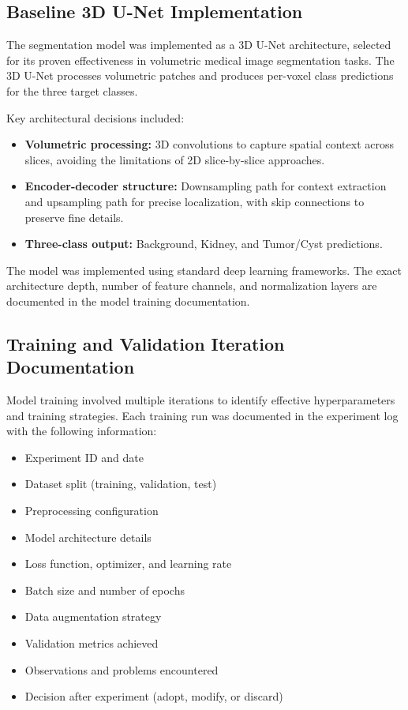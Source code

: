 \subsection{Baseline 3D U-Net Implementation}

The segmentation model was implemented as a 3D U-Net architecture, selected for its proven effectiveness in volumetric medical image segmentation tasks. The 3D U-Net processes volumetric patches and produces per-voxel class predictions for the three target classes.

Key architectural decisions included:
\begin{itemize}
    \item \textbf{Volumetric processing:} 3D convolutions to capture spatial context across slices, avoiding the limitations of 2D slice-by-slice approaches.
    \item \textbf{Encoder-decoder structure:} Downsampling path for context extraction and upsampling path for precise localization, with skip connections to preserve fine details.
    \item \textbf{Three-class output:} Background, Kidney, and Tumor/Cyst predictions.
\end{itemize}

The model was implemented using standard deep learning frameworks. The exact architecture depth, number of feature channels, and normalization layers are documented in the model training documentation.

\subsection{Training and Validation Iteration Documentation}

Model training involved multiple iterations to identify effective hyperparameters and training strategies. Each training run was documented in the experiment log with the following information:

\begin{itemize}
    \item Experiment ID and date
    \item Dataset split (training, validation, test)
    \item Preprocessing configuration
    \item Model architecture details
    \item Loss function, optimizer, and learning rate
    \item Batch size and number of epochs
    \item Data augmentation strategy
    \item Validation metrics achieved
    \item Observations and problems encountered
    \item Decision after experiment (adopt, modify, or discard)
\end{itemize}


